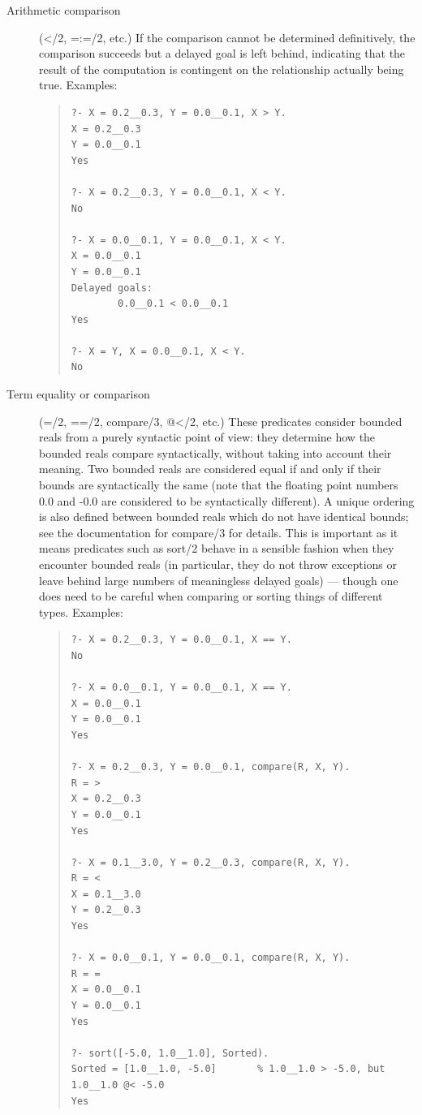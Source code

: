 \begin{description}
\item
[Arithmetic comparison] (</2, =:=/2, etc.)
If the comparison cannot be determined definitively, the comparison succeeds
but a delayed goal is left behind, indicating that the result of the
computation is contingent on the relationship actually being true.
Examples:

\begin{quote}\begin{verbatim}
?- X = 0.2__0.3, Y = 0.0__0.1, X > Y.
X = 0.2__0.3
Y = 0.0__0.1
Yes

?- X = 0.2__0.3, Y = 0.0__0.1, X < Y.
No

?- X = 0.0__0.1, Y = 0.0__0.1, X < Y.
X = 0.0__0.1
Y = 0.0__0.1
Delayed goals:
        0.0__0.1 < 0.0__0.1
Yes

?- X = Y, X = 0.0__0.1, X < Y.
No
\end{verbatim}\end{quote}

\item
[Term equality or comparison] (=/2, ==/2, compare/3, @</2, etc.)
These predicates consider bounded reals from a purely syntactic point of
view: they determine how the bounded reals compare syntactically, without
taking into account their meaning.  Two bounded reals are considered equal
if and only if their bounds are syntactically the same (note that the
floating point numbers 0.0 and -0.0 are considered to be syntactically
different).  A unique ordering is also defined between bounded reals which
do not have identical bounds; see the documentation for compare/3 for
details.  This is important as it means predicates such as sort/2 behave in
a sensible fashion when they encounter bounded reals (in particular, they do
not throw exceptions or leave behind large numbers of meaningless delayed
goals) --- though one does need to be careful when comparing or sorting
things of different types.
Examples:

\begin{quote}\begin{verbatim}
?- X = 0.2__0.3, Y = 0.0__0.1, X == Y.
No

?- X = 0.0__0.1, Y = 0.0__0.1, X == Y.
X = 0.0__0.1
Y = 0.0__0.1
Yes

?- X = 0.2__0.3, Y = 0.0__0.1, compare(R, X, Y).
R = >
X = 0.2__0.3
Y = 0.0__0.1
Yes

?- X = 0.1__3.0, Y = 0.2__0.3, compare(R, X, Y).
R = <
X = 0.1__3.0
Y = 0.2__0.3
Yes

?- X = 0.0__0.1, Y = 0.0__0.1, compare(R, X, Y).
R = =
X = 0.0__0.1
Y = 0.0__0.1
Yes

?- sort([-5.0, 1.0__1.0], Sorted).
Sorted = [1.0__1.0, -5.0]       % 1.0__1.0 > -5.0, but 1.0__1.0 @< -5.0
Yes
\end{verbatim}\end{quote}

\end{description}

